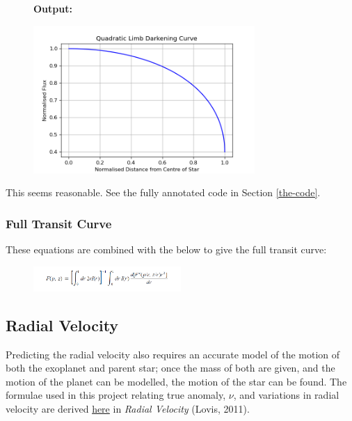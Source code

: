 \documentclass[11pt]{article}
\newcommand*{\figuretitle}[1]{
    	{\textbf{#1}
    	\par\vspace{-1em}}
    }
\begin{document}
\begin{figure}[H]
	\figuretitle{Output:}
	\centering
	\includegraphics[width=0.75\textwidth]{../matplotlib_graphs/limb_darkening.png}
\end{figure}    
    
This seems reasonable. See the fully annotated code in Section \ref{the-code}.

    \hypertarget{full-transit-curve}{%
\subsubsection{Full Transit Curve}\label{full-transit-curve}}

These equations are combined with the below to give the full transit
curve:

\begin{figure}[!ht]
	\centering
	\includegraphics[width=0.5\textwidth]{../images/flux_eq.png}
	\label{Figure 2.f}
\end{figure}

    \hypertarget{radial-velocity}{%
\subsection{Radial Velocity}\label{radial-velocity}}

Predicting the radial velocity also requires an accurate model of the
motion of both the exoplanet and parent star; once the mass of both are given, and the motion of the planet can be modelled, the motion of the star can be found. The formulae used in this project relating true anomaly, \(\nu\), and variations in radial velocity are derived \href{http://exoplanets.astro.yale.edu/workshop/EPRV/Bibliography_files/Radial_Velocity.pdf}{here} in \emph{Radial Velocity} (Lovis, 2011).
\end{document}
